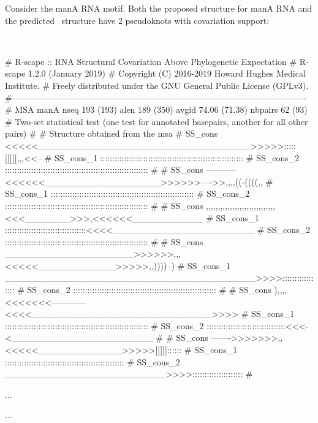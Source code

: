 Consider the manA RNA motif. Both the proposed structure for manA RNA
and the predicted \rscape\ structure have 2 pseudoknots with
covariation support:

\\


\begin{sreoutput}
# R-scape :: RNA Structural Covariation Above Phylogenetic Expectation
# R-scape 1.2.0 (January 2019)
# Copyright (C) 2016-2019 Howard Hughes Medical Institute.
# Freely distributed under the GNU General Public License (GPLv3).
#-------------------------------------------------------------------------------------------------------
# MSA manA nseq 193 (193) alen 189 (350) avgid 74.06 (71.38) nbpairs 62 (93)
# Two-set statistical test (one test for annotated basepairs, another for all other pairs)
#
# Structure obtained from the msa
# SS_cons   <<<<<_________________________________>>>>>:::::[[[[[,,,<<--
# SS_cons_1 ::::::::::::::::::::::::::::::::::::::::::::::::::::::::::::
# SS_cons_2 ::::::::::::::::::::::::::::::::::::::::::::::::::::::::::::
#
# SS_cons   -----------<<<<<<__________________>>>>>>---->>,,,,((-((((,,
# SS_cons_1 ::::::::::::::::::::::::::::::::::::::::::::::::::::::::::::
# SS_cons_2 ::::::::::::::::::::::::::::::::::::::::::::::::::::::::::::
#
# SS_cons   ,,,,,,,,,,,,,,,,,,,,,,,,,,,,,<<<_______>>>,<<<<<<___________
# SS_cons_1 ::::::::::::::::::::::::::::::::::<<<<______________________
# SS_cons_2 ::::::::::::::::::::::::::::::::::::::::::::::::::::::::::::
#
# SS_cons   ____________________>>>>>>,,,<<<<<____________>>>>>,,))))--)
# SS_cons_1 _______________________________________>>>>:::::::::::::::::
# SS_cons_2 ::::::::::::::::::::::::::::::::::::::::::::::::::::::::::::
#
# SS_cons   ),,,,<<<<<<<------------<<<<____________________________>>>>
# SS_cons_1 ::::::::::::::::::::::::::::::::::::::::::::::::::::::::::::
# SS_cons_2 :::::::::::::::::::::::::::::::::<<<-<______________________
#
# SS_cons   ------->>>>>>>,,<<<<<_____________>>>>>]]]]]::::::
# SS_cons_1 ::::::::::::::::::::::::::::::::::::::::::::::::::
# SS_cons_2 _________________________>>>>:::::::::::::::::::::
#

  ...

  ...
  

\end{sreoutput}
